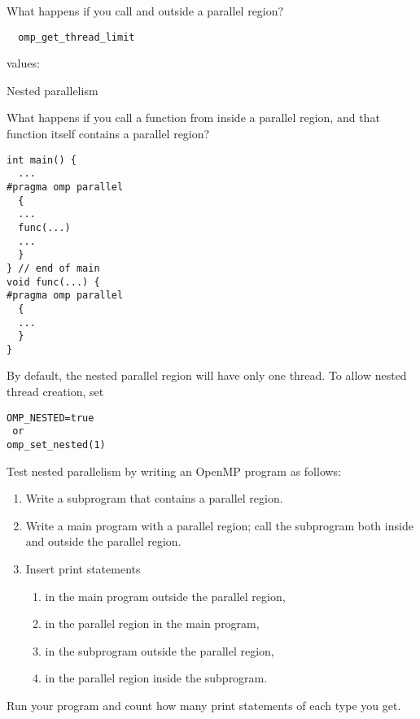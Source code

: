 \begin{exercise}
  What happens if you call  and 
  outside a parallel region?
\end{exercise}

\begin{lstlisting}
  omp_get_thread_limit
\end{lstlisting}

 values: 

 {Nested parallelism}

What happens if you call a function from inside a parallel region, and
that function itself contains a parallel region?
\begin{lstlisting}
int main() {
  ...
#pragma omp parallel
  {
  ...
  func(...)
  ...
  }
} // end of main
void func(...) {
#pragma omp parallel
  {
  ...
  }
}
\end{lstlisting}

By default, the nested parallel region will have only one thread. To
allow nested thread creation, set
\begin{verbatim}
OMP_NESTED=true
 or
omp_set_nested(1)
\end{verbatim}

\begin{exercise}
  Test nested parallelism by writing an OpenMP program as follows:
  \begin{enumerate}
  \item Write a subprogram that contains a parallel region.
  \item\label{ex:nest:sub} Write a main program with a parallel region; call the subprogram both inside and outside the parallel region.
    \item Insert print statements 
      \begin{enumerate}
      \item in the main program outside the parallel region,
      \item in the parallel region in the main program,
      \item\label{ex:nest:sub:sub} in the subprogram outside the parallel region,
      \item in the parallel region inside the subprogram.
      \end{enumerate}
  \end{enumerate}
  Run your program and count how many print statements of each type you get.
\end{exercise}

